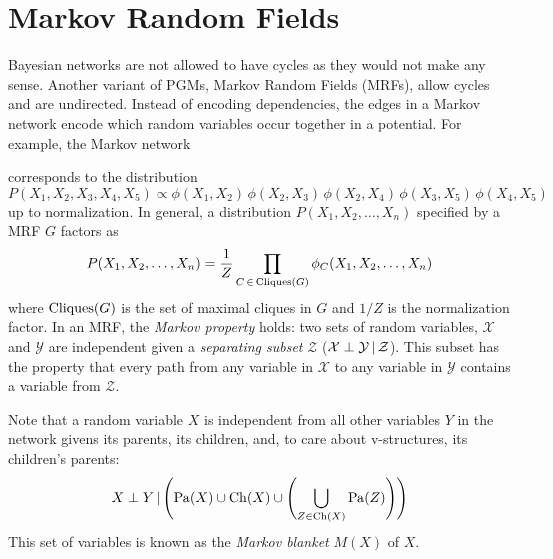 \chapter{Markov Random Fields}
	\label{c:mrf}

	Bayesian networks are not allowed to have cycles as they would not make any sense. Another variant of PGMs, Markov Random Fields (MRFs), allow cycles and are undirected. Instead of encoding dependencies, the edges in a Markov network encode which random variables occur together in a potential. For example, the Markov network
	\begin{center}
	\end{center}
	corresponds to the distribution
	\begin{equation}
		P(X_1, X_2, X_3, X_4, X_5) \propto \phi(X_1, X_2) \, \phi(X_2, X_3) \, \phi(X_2, X_4) \, \phi(X_3, X_5) \, \phi(X_4, X_5)
	\end{equation}
	up to normalization. In general, a distribution \( P(X_1, X_2, \dots, X_n) \) specified by a MRF \(G\) factors as
	\begin{equation}
		P(X_1, X_2, \dots, X_n) = \frac{1}{Z} \prod_{C \,\in\, \operatorname{Cliques}(G)} \phi_C(X_1, X_2, \dots, X_n)
	\end{equation}
	where \( \operatorname{Cliques}(G) \) is the set of maximal cliques in \(G\) and \(1/Z\) is the normalization factor. In an MRF, the \emph{Markov property} holds: two sets of random variables, \(\mathcal{X}\) and \(\mathcal{Y}\) are independent given a \emph{separating subset} \(\mathcal{Z}\) (\( \mathcal{X} \perp \mathcal{Y} \,\vert\, \mathcal{Z} \)). This subset has the property that every path from any variable in \(\mathcal{X}\) to any variable in \(\mathcal{Y}\) contains a variable from \(\mathcal{Z}\).

	Note that a random variable \(X\) is independent from all other variables \(Y\) in the network givens its parents, its children, and, to care about v-structures, its children's parents:
	\begin{equation}
		X \perp Y \,\vert\, \Biggl( \operatorname{Pa}(X) \cup \operatorname{Ch}(X) \cup \Biggl( \bigcup_{Z \in \operatorname{Ch}(X)} \operatorname{Pa}(Z) \Biggr) \Biggr)
	\end{equation}
	This set of variables is known as the \emph{Markov blanket} \(M(X)\) of \(X\).


